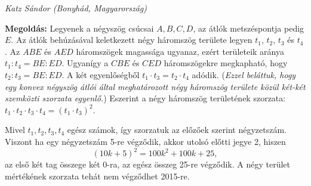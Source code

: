 \documentclass[a4paper,10pt,leqno]{article}
\newcommand{\ki}[2]{\hfill {\it #1 (#2)}\medskip}
\begin{document}
\ki{Katz Sándor}{Bonyhád, Magyarország}\medskip

{\bf Megoldás: } Legyenek a négyszög csúcsai $A, B, C, D$, az átlók metszéspontja pedig $E$. Az átlók behúzásával keletkezett négy háromszög területe legyen $t_1$, $t_2$, $t_3$ és $t_4$.
Az $ABE$ és $AED$ háromszögek magassága ugyanaz, ezért területeik aránya $t_1:t_4=BE:ED$. Ugyanígy a  $CBE$ és $CED$ háromszögekre megkapható, hogy $t_2:t_3=BE:ED$. A két egyenlőségből $t_1\cdot t_3=t_2\cdot t_4$ adódik.
(\textit{Ezzel beláttuk, hogy egy konvex négyszög átlói által meghatározott négy háromszög területe közül két-két szemközti szorzata egyenlő.})
Eszerint a négy háromszög területének szorzata: $t_1\cdot t_2\cdot t_3\cdot t_4=(t_1\cdot t_3)^2$.

\begin{center}
\end{center}

Mivel $t_1, t_2, t_3, t_4$  egész számok, így szorzatuk az előzőek szerint négyzetszám.
Viszont ha egy négyzetszám 5-re végződik, akkor utolsó előtti jegye 2, hiszen
$$(10k+5)^2=100k^2+100k+25,$$
az első két tag összege két 0-ra, az egész összeg 25-re végződik.
A négy terület mértékének szorzata tehát nem végződhet 2015-re.
\end{document}

